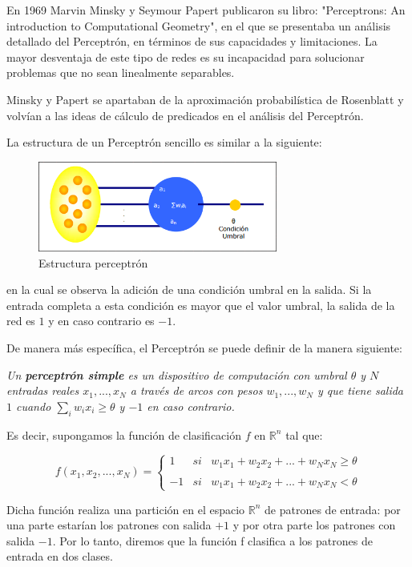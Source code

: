 \documentclass[a4paper, 11pt]{article} %
\begin{document}
En 1969 Marvin Minsky y Seymour Papert publicaron su libro: "Perceptrons: An introduction to Computational Geometry", en el que se presentaba un análisis detallado del Perceptrón, en términos de sus capacidades y limitaciones. La mayor desventaja de este tipo de redes es su incapacidad para solucionar problemas que no sean linealmente separables.

Minsky y Papert se apartaban de la aproximación probabilística de Rosenblatt y volvían a las ideas de cálculo de predicados en el análisis del Perceptrón.

La estructura de un Perceptrón sencillo es similar a la siguiente:

\begin{figure}[H]
\centering
\includegraphics[width=0.7\textwidth]{Perceptron.PNG}
\caption{Estructura perceptrón}
\label{Estructura Perceptron}
\end{figure}

en la cual se observa la adición de una condición umbral en la salida. Si la entrada completa a esta condición es mayor que el valor umbral, la salida de la red es $1$ y en caso contrario es $-1$.

De manera más específica, el Perceptrón se puede definir de la manera siguiente:

\textit{Un \textbf{perceptrón simple} es un dispositivo de computación con umbral $\theta$ y $N$ entradas reales $x_1, ..., x_N$ a través de arcos con pesos $w_1, ..., w_N$ y que tiene salida $1$ cuando $\sum_{i}w_ix_i \geq \theta$ y $-1$ en caso contrario.}

Es decir, supongamos la función  de clasificación $f$ en $\mathbb{R}^n$ tal que:

\[
f(x_1, x_2, ..., x_N) = \left\{ \begin{array}{lcc}
             1 &   si  & w_1x_1 + w_2x_2 + ... + w_Nx_N \geq \theta \\
             \\ -1 &  si  &  w_1x_1 + w_2x_2 + ... + w_Nx_N < \theta
             \end{array}
   \right.
\]

Dicha función realiza una partición en el espacio $\mathbb{R}^n$ de patrones de entrada: por una parte estarían los patrones con salida $+1$ y por otra parte los patrones con salida $- 1$. Por lo tanto, diremos que la función f clasifica a los patrones de entrada en dos clases.
\end{document}
